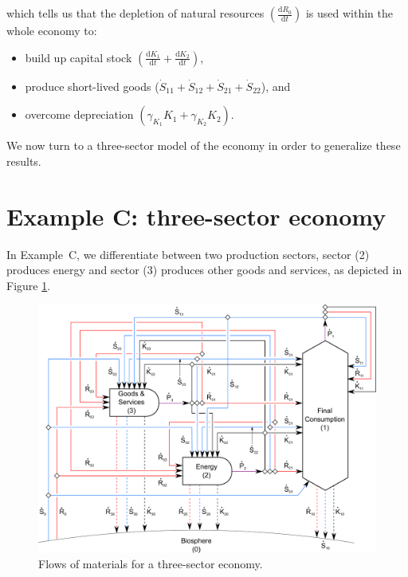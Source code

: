 \noindent{}which tells us that
the depletion of natural resources
$\left(\frac{\mathrm{d}R_{0}}{\mathrm{d}t}\right)$
is used within the whole economy to:

\begin{itemize}
	\item{build up capital stock
	$\left(\frac{\mathrm{d}K_{1}}{\mathrm{d}t}
	+ \frac{\mathrm{d}K_{2}}{\mathrm{d}t}\right)$,}
	\item{produce short-lived goods
	($\dot{S}_{11}
	+ \dot{S}_{12} 
	+ \dot{S}_{21}
	+ \dot{S}_{22}$), and}
	\item{overcome depreciation
	$\left(\gamma_{K_{1}}K_{1}
	+ \gamma_{K_{2}}K_{2}\right)$.}
\end{itemize}

We now turn to a three-sector model of the economy
in order to generalize these results.


\section{Example C: three-sector economy} %
\label{sec:C_materials}

In Example~C, we differentiate between two production sectors, sector (2) produces energy
and sector (3) produces other goods and services, as depicted in Figure
\ref{fig:C_materials}.

\begin{landscape}
\begin{figure}[!ht]
\centering
\includegraphics[width=0.8\linewidth]{Part_1/Chapter_Materials/images/3_sector_materials.pdf}
\caption[Flows of materials for a three-sector economy]{Flows of materials for a three-sector economy.}
\label{fig:C_materials}
\end{figure}
\end{landscape}

